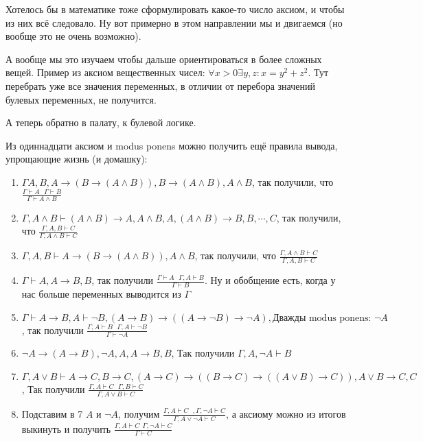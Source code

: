 Хотелось бы в математике тоже сформулировать какое-то число аксиом, и чтобы из них всё следовало. Ну вот примерно в этом направлении мы и двигаемся (но вообще это не очень возможно). 

А вообще мы это изучаем чтобы дальше ориентироваться в более сложных вещей. Пример из аксиом вещественных чисел: $\forall x > 0 \exists y, z : x = y^2 + z^2$. Тут перебрать уже все значения переменных, в отличии от перебора значений булевых переменных, не получится. 

А теперь обратно в палату, к булевой логике.


Из одиннадцати аксиом и modus ponens можно получить ещё правила вывода, упрощающие жизнь (и домашку):

\begin{enumerate}
	\item{$\Gamma A, B, A \to (B \to (A \land B)), B \to (A \land B), A \land B$, так получили, что $\frac{\Gamma \vdash A\ \ \ \Gamma \vdash B}{\Gamma \vdash A \land B}$}
	\item{$ \Gamma, A \land B \vdash (A \land B) \to A, A \land B, A, (A \land B) \to B, B, \cdots, C$, так получили, что $\frac{\Gamma, A, B \vdash C}{\Gamma, A \land B \vdash C}$}
	\item{$\Gamma, A, B \vdash A \to (B \to (A \land B)), A \land B $, так получили, что $\frac{\Gamma, A \land B \vdash C}{\Gamma, A, B \vdash C}$}
	\item{$\Gamma \vdash A, A \to B, B$, так получили $\frac{\Gamma \vdash A\ \ \ \Gamma, A \vdash B}{\Gamma \vdash B}$. Ну и обобщение есть, когда у нас больше переменных выводится из $\Gamma$}
	\item{$\Gamma \vdash A \to B, A \vdash \lnot B, (A \to B) \to ((A \to \lnot B) \to \lnot A ), \text{Дважды modus ponens: } \lnot A$, так получили $\frac{\Gamma, A \vdash B\ \ \ \Gamma, A \vdash \lnot B}{\Gamma \vdash \lnot A} $}
	\item{$\lnot A \to (A \to B), \lnot A, A, A \to B, B$, Так получили $\Gamma, A, \lnot A \vdash B$}
	\item{$\Gamma, A \lor B \vdash A \to C, B \to C, (A \to C) \to ((B \to C) \to ((A \lor B) \to C)), A \lor B \to C, C$, Так получили $\frac{\Gamma, A \vdash C\ \ \ \Gamma, B \vdash C}{\Gamma, A \lor B \vdash C}$}
	\item{Подставим в 7 $A$ и $\lnot A$, получим $\frac{\Gamma, A \vdash C\ \ \ , \Gamma, \lnot A \vdash C}{\Gamma, A \lor \lnot A \vdash C}$, а аксиому можно из итогов выкинуть и получить $\frac{\Gamma, A \vdash C\ \ \Gamma, \lnot A \vdash C}{\Gamma \vdash C}$}
\end{enumerate}

